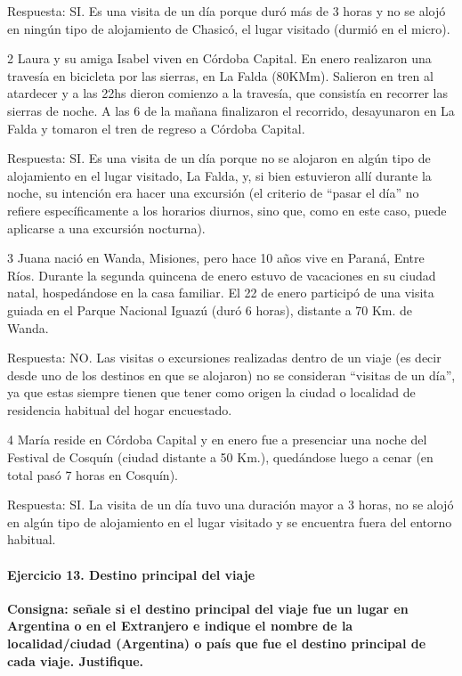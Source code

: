 \documentclass[
  openany]{book}
\begin{document}
Respuesta: SI. Es una visita de un día porque duró más de 3 horas y no se alojó en ningún tipo de alojamiento de Chasicó, el lugar visitado (durmió en el micro).

2 Laura y su amiga Isabel viven en Córdoba Capital. En enero realizaron una travesía en bicicleta por las sierras, en La Falda (80KMm). Salieron en tren al atardecer y a las 22hs dieron comienzo a la travesía, que consistía en recorrer las sierras de noche. A las 6 de la mañana finalizaron el recorrido, desayunaron en La Falda y tomaron el tren de regreso a Córdoba Capital.

Respuesta: SI. Es una visita de un día porque no se alojaron en algún tipo de alojamiento en el lugar visitado, La Falda, y, si bien estuvieron allí durante la noche, su intención era hacer una excursión (el criterio de ``pasar el día'' no refiere específicamente a los horarios diurnos, sino que, como en este caso, puede aplicarse a una excursión nocturna).

3 Juana nació en Wanda, Misiones, pero hace 10 años vive en Paraná, Entre Ríos. Durante la segunda quincena de enero estuvo de vacaciones en su ciudad natal, hospedándose en la casa familiar. El 22 de enero participó de una visita guiada en el Parque Nacional Iguazú (duró 6 horas), distante a 70 Km. de Wanda.

Respuesta: NO. Las visitas o excursiones realizadas dentro de un viaje (es decir desde uno de los destinos en que se alojaron) no se consideran ``visitas de un día'', ya que estas siempre tienen que tener como origen la ciudad o localidad de residencia habitual del hogar encuestado.

4 María reside en Córdoba Capital y en enero fue a presenciar una noche del Festival de Cosquín (ciudad distante a 50 Km.), quedándose luego a cenar (en total pasó 7 horas en Cosquín).

Respuesta: SI. La visita de un día tuvo una duración mayor a 3 horas, no se alojó en algún tipo de alojamiento en el lugar visitado y se encuentra fuera del entorno habitual.

\hypertarget{ejercicio-13.-destino-principal-del-viaje-1}{%
\paragraph{Ejercicio 13. Destino principal del viaje}\label{ejercicio-13.-destino-principal-del-viaje-1}}

\textbf{Consigna: señale si el destino principal del viaje fue un lugar en Argentina o en el Extranjero e indique el nombre de la localidad/ciudad (Argentina) o país que fue el destino principal de cada viaje. Justifique.}
\end{document}
